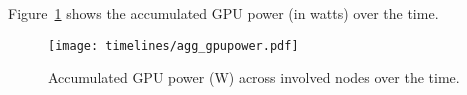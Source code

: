 Figure~\ref{fig:agg_gpupwr} shows the accumulated GPU power (in watts) over the time. 

\begin{figure}[htbp]
\texttt{[image: timelines/agg\_gpupower.pdf]}
\caption{Accumulated GPU power (W) across involved nodes over the time.}\label{fig:agg_gpupwr}
\end{figure}
